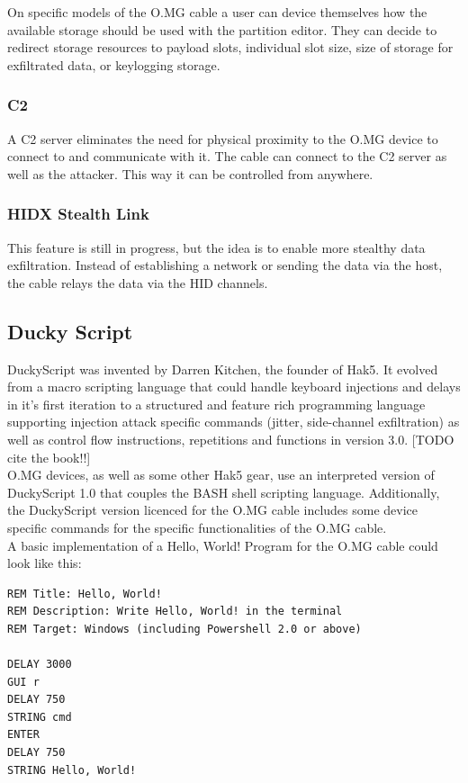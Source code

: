On specific models of the O.MG cable a user can device themselves how the available storage should be used with the partition editor. They can decide to redirect storage resources to payload slots, individual slot size, size of storage for exfiltrated data, or keylogging storage. 

\subsubsection{C2}
A C2 server eliminates the need for physical proximity to the O.MG device to connect to and communicate with it. The cable can connect to the C2 server as well as the attacker. This way it can be controlled from anywhere. 

\subsubsection{HIDX Stealth Link}
This feature is still in progress, but the idea is to enable more stealthy data exfiltration. Instead of establishing a network or sending the data via the host, the cable relays the data via the HID channels.  


\subsection{Ducky Script} \label{DuckyScript}

DuckyScript was invented by Darren Kitchen, the founder of Hak5. It evolved from a macro scripting language that could handle keyboard injections and delays in it's first iteration to a structured and feature rich programming language supporting injection attack specific commands (jitter, side-channel exfiltration) as well as control flow instructions, repetitions and functions in version 3.0. \cite{the book} [TODO cite the book!!] \\
O.MG devices, as well as some other Hak5 gear, use an interpreted version of DuckyScript 1.0 that couples the BASH shell scripting language. \cite{Hak5Usbrubberduckypayloads2024} Additionally, the DuckyScript version licenced for the O.MG cable includes some device specific commands for the specific functionalities of the O.MG cable. \\
A basic implementation of a Hello, World! Program for the O.MG cable could look like this:

\begin{verbatim}
REM Title: Hello, World!
REM Description: Write Hello, World! in the terminal
REM Target: Windows (including Powershell 2.0 or above)

DELAY 3000
GUI r
DELAY 750
STRING cmd
ENTER
DELAY 750
STRING Hello, World!

\end{verbatim}



